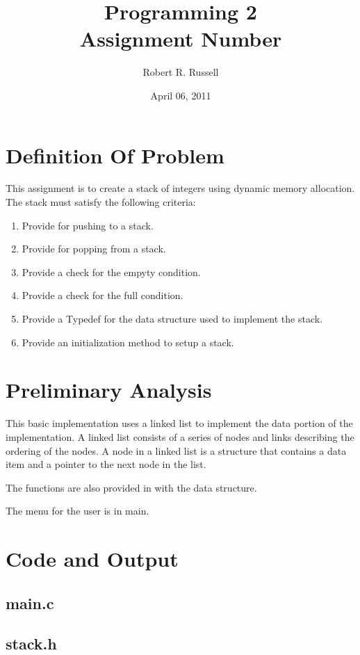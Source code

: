 \documentclass[letterpaper,oneside]{scrartcl}
\title{Programming 2\\Assignment Number}
\author{Robert R. Russell}
\date{April 06, 2011}
\begin{document}
\maketitle

\section{Definition Of Problem}
This assignment is to create a stack of integers using dynamic memory allocation.
The stack must satisfy the following criteria:
\begin{enumerate}
\item Provide for pushing to a stack.
\item Provide for popping from a stack.
\item Provide a check for the empyty condition.
\item Provide a check for the full condition.
\item Provide a Typedef for the data structure used to implement the stack.
\item Provide an initialization method to setup a stack.
\end{enumerate}

\section{Preliminary Analysis}

This basic implementation uses a linked list to implement the data portion of the implementation.
A linked list consists of a series of nodes and links describing the ordering of the nodes.
A node in a linked list is a structure that contains a data item and a pointer to the next node in the list.

The functions are also provided in with the data structure.

The menu for the user is in main.

\section{Code and Output}

\subsection{main.c}

\subsection{stack.h}
\end{document}
